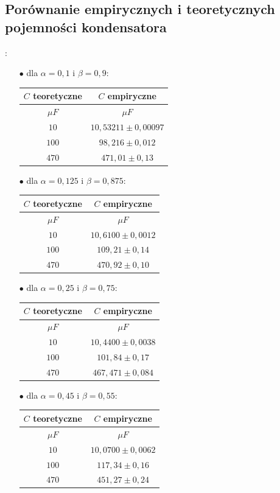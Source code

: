 \documentclass[12pt]{mwart}
\begin{document}
	\subsection{Porównanie empirycznych i teoretycznych pojemności kondensatora}:
	\begin{itemize}
		\item[$\bullet$] dla $\alpha=0,1$ i $\beta=0,9$:
		\begin{table}[h]
			\centering
			\begin{tabular}{cc}
				\hline
				$C$ teoretyczne & $C$ empiryczne \\ \hline
				$\mu F$ & $\mu F$ \\ \hline
				$10$ & $10,53211\pm0,00097$  \\ \hline
				$100$ & $98,216\pm0,012$  \\ \hline
				$470$ & $471,01\pm0,13$  \\ \hline
			\end{tabular}
		\end{table}
		\item[$\bullet$] dla $\alpha=0,125$ i $\beta=0,875$:
		\begin{table}[h]
			\centering
			\begin{tabular}{cc}
				\hline
				$C$ teoretyczne & $C$ empiryczne \\ \hline
				$\mu F$ & $\mu F$ \\ \hline
				$10$ & $10,6100\pm0,0012$  \\ \hline
				$100$ & $109,21\pm0,14$  \\ \hline
				$470$ & $470,92\pm0,10$  \\ \hline
			\end{tabular}
		\end{table}
		\item[$\bullet$] dla $\alpha=0,25$ i $\beta=0,75$:
		\begin{table}[H]
			\centering
			\begin{tabular}{cc}
				\hline
				$C$ teoretyczne & $C$ empiryczne \\ \hline
				$\mu F$ & $\mu F$ \\ \hline
				$10$ & $10,4400\pm0,0038$  \\ \hline
				$100$ & $101,84\pm0,17$  \\ \hline
				$470$ & $467,471\pm0,084$  \\ \hline
			\end{tabular}
		\end{table}
		\item[$\bullet$] dla $\alpha=0,45$ i $\beta=0,55$:
		\begin{table}[h]
			\centering
			\begin{tabular}{cc}
				\hline
				$C$ teoretyczne & $C$ empiryczne \\ \hline
				$\mu F$ & $\mu F$ \\ \hline
				$10$ & $10,0700\pm0,0062$  \\ \hline
				$100$ & $117,34\pm0,16$  \\ \hline
				$470$ & $451,27\pm0,24$  \\ \hline
			\end{tabular}
		\end{table}
	\end{itemize}
\end{document}

